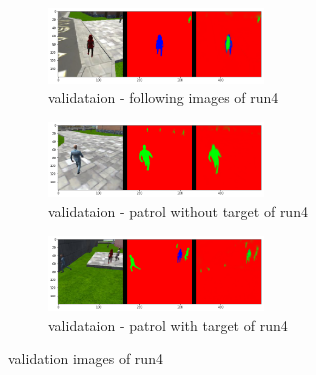 \documentclass[paper=a4, fontsize=11pt]{scrartcl} %
\numberwithin{equation}{section} %
\numberwithin{figure}{section} %
\numberwithin{table}{section} %
\begin{document}
\begin{figure}[ht]
	\begin{subfigure}{0.33\textwidth}
	\includegraphics[width=0.9\linewidth, height=2cm]{./imgs/following_images4.png} 
	\caption{validataion - following images of run4}
	\label{fig:subfollowing_images4}
	\end{subfigure}
	\begin{subfigure}{0.33\textwidth}
	\includegraphics[width=0.9\linewidth, height=2cm]{./imgs/patrol_non_targ4.png}
	\caption{validataion - patrol without target of run4}
	\label{fig:subpatrol_non_targ4}
	\end{subfigure}
	\begin{subfigure}{0.33\textwidth}
	\includegraphics[width=0.9\linewidth, height=2cm]{./imgs/patrol_with_targ4.png}
	\caption{validataion - patrol with target of run4}
	\label{fig:subpatrol_with_targ4}
	\end{subfigure}

	\caption{validation images of run4}
	\label{fig:outputimages4}
\end{figure}
\end{document}
